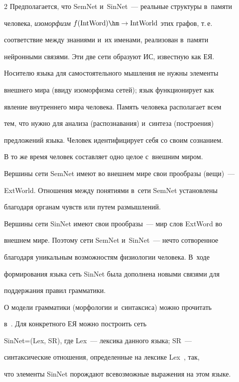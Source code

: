 \begin{multicols}{2}
  Предполагается, что SemNet и~SinNet~--- реальные структуры в~памяти 

человека, \textit{изоморфизм} $f(\mathrm{IntWord})\hm\to\mathrm{IntWorld}$ этих графов, т.\,е.\

 соответствие между знаниями и~их именами, реализован в~памяти 

нейронными связями. Эти две сети образуют ИС, известную как ЕЯ.

  

  Носителю языка для самостоятельного мыш\-ле\-ния не нуж\-ны элементы 

внешнего мира (вви\-ду изоморфизма сетей); язык функционирует как 

явление внут\-рен\-не\-го мира человека. Память человека располагает всем 

тем, что нужно для анализа (распознавания) и~синтеза (по\-стро\-ения) 

предложений языка. Человек идентифицирует себя со своим со\-зна\-нием.

  

  В то же время человек со\-став\-ля\-ет одно целое с~внеш\-ним миром. 

Вершины сети SemNet имеют во внеш\-нем мире свои прообразы (вещи)~---

ExtWorld. Отношения между понятиями в~сети SemNet установлены 

благодаря органам чувств или путем размышлений. 

  

  Вершины сети SinNet имеют свои прообразы~--- мир слов ExtWord во 

внешнем мире. Поэтому сети SemNet и~SinNet~--- нечто со\-тво\-рен\-ное 

благодаря уникальным возможностям физиологии человека. В~ходе 

формирования языка сеть SinNet была дополнена новыми связями для 

поддержания правил грамматики.

  

  О модели грамматики (морфологии и~синтаксиса) можно прочитать 

в~\cite{2-sh, 5-sh}. Для конкретного ЕЯ можно по\-стро\-ить сеть 

SinNet\;=\;(Lex, SR), где Lex~--- лек\-си\-ка данного языка; SR~--- 

синтаксические отношения, определенные на лек\-си\-ке Lex~\cite{6-sh}, так, 

что элементы SinNet по\-рож\-да\-ют все\-воз\-мож\-ные выражения на этом языке. 


\end{multicols}
